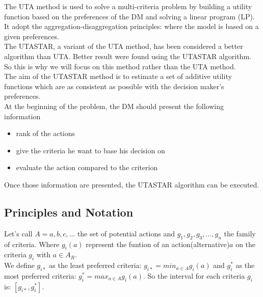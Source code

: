 \documentclass{report}
\begin{document}
The UTA method is used to solve a multi-criteria problem by building a utility function based on the preferences of the DM and solving a linear program (LP). It adopt the aggregation-disaggregation principles: where the model is based on a given preferences.\\ The UTASTAR, a variant of the UTA method, has been considered a better algorithm than UTA. Better result were found using the UTASTAR algorithm. So this is why we will focus on this method rather than the UTA method.\\The aim of the UTASTAR method is to estimate a set of additive utility functions which are as consistent as possible with the decision maker's preferences.\\
At the beginning of the problem, the DM should present the following information 
\begin{itemize}
\item rank of the actions
\item give the criteria he want to base his decision on 
\item evaluate the action compared to the criterion
\end{itemize}
Once those information are presented, the UTASTAR algorithm can be executed. 

\newpage
\subsection{Principles and Notation}
Let's call $A={a,b,c,...}$ the set of potential actions and $g_1, g_2, g_3, ..., g_n$ the family of criteria. Where $g_i(a)$ represent the funtion of an action(alternative)$a$ on the criteria $g_i$ with $a \in A_R$. \\

We define $g_{i*}$ as the least preferred criteria: $g_{i*} = min_{a \in A} g_i (a)$ and $g_i^{*}$ as the most preferred criteria: $g_i^{*} = max_{a \in A} g_i (a)$. So the interval for each criteria $g_i$ is: $[g_{i*} , g_i^{*}]$.\\
\end{document}
